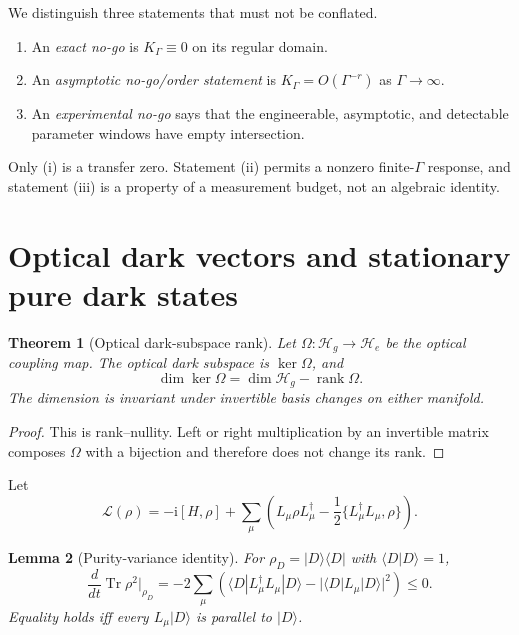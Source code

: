 \documentclass[11pt,a4paper]{article}
\newtheorem{theorem}{Theorem}[section]
\newtheorem{lemma}[theorem]{Lemma}
\theoremstyle{remark}
\newcommand{\im}{\mathrm{i}}
\newcommand{\Tr}{\operatorname{Tr}}
\newcommand{\rank}{\operatorname{rank}}
\newcommand{\ket}[1]{|#1\rangle}
\newcommand{\bra}[1]{\langle #1|}
\newcommand{\braket}[2]{\langle #1|#2\rangle}
\begin{document}
We distinguish three statements that must not be conflated.
\begin{enumerate}[label=(\roman*)]
\item An \emph{exact no-go} is $K_\Gamma\equiv0$ on its regular domain.
\item An \emph{asymptotic no-go/order statement} is
      $K_\Gamma=O(\Gamma^{-r})$ as $\Gamma\to\infty$.
\item An \emph{experimental no-go} says that the engineerable, asymptotic,
      and detectable parameter windows have empty intersection.
\end{enumerate}
Only (i) is a transfer zero.  Statement (ii) permits a nonzero finite-$\Gamma$
response, and statement (iii) is a property of a measurement budget, not an
algebraic identity.

\section{Optical dark vectors and stationary pure dark states}

\begin{theorem}[Optical dark-subspace rank]
Let $\Omega:\mathcal H_g\to\mathcal H_e$ be the optical coupling map.  The
optical dark subspace is $\ker\Omega$, and
\[
\dim\ker\Omega=\dim\mathcal H_g-\rank\Omega.
\]
The dimension is invariant under invertible basis changes on either manifold.
\end{theorem}

\begin{proof}
This is rank--nullity.  Left or right multiplication by an invertible matrix
composes $\Omega$ with a bijection and therefore does not change its rank.
\end{proof}

Let
\begin{equation}
\mathcal L(\rho)=-\im[H,\rho]
+\sum_\mu\left(L_\mu\rho L_\mu^\dagger
-\frac12\{L_\mu^\dagger L_\mu,\rho\}\right).
\label{eq:gksl}
\end{equation}

\begin{lemma}[Purity-variance identity]
For $\rho_D=\ket D\bra D$ with $\braket DD=1$,
\[
\frac{d}{dt}\Tr\rho^2\Big|_{\rho_D}
=-2\sum_\mu\left(
\bra D L_\mu^\dagger L_\mu\ket D
-|\bra D L_\mu\ket D|^2\right)\le0.
\]
Equality holds iff every $L_\mu\ket D$ is parallel to $\ket D$.
\end{lemma}
\end{document}
